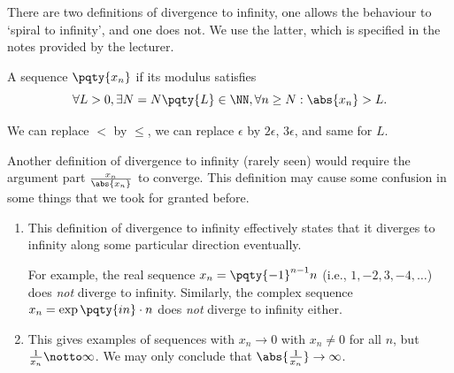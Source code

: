 There are two definitions of divergence to infinity, one allows the behaviour to `spiral to infinity', and one does not. We use the latter, which is specified in the notes provided by the lecturer.

\begin{definition}
    \label{def:seq-divergence-to-infinity}%
    A sequence \(\pqty{x_n}\)  if its modulus satisfies
    \[
        \forall L > 0, \exists N = N \pqty{L} \in \NN, \forall n \geq N: \abs{x_n} > L.
    \]
\end{definition}

\begin{remark}
    We can replace \(<\) by \(\leq\), we can replace \(\epsilon\) by \(2 \epsilon\), \(3 \epsilon\), and same for \(L\).
\end{remark}

\begin{remarks}
    Another definition of divergence to infinity (rarely seen) would require the argument part \(\frac{x_n}{\abs{x_n}}\) to converge. This definition may cause some confusion in some things that we took for granted before.

    \begin{enumerate}
        \item This definition of divergence to infinity effectively states that it diverges to infinity along some particular direction eventually.
        
        For example, the real sequence \(x_n = \pqty{-1}^{n - 1} n\) (i.e., \(1, -2, 3, -4, \ldots\)) does \emph{not} diverge to infinity. Similarly, the complex sequence \(x_n = \exp\pqty{in} \cdot n\) does \emph{not} diverge to infinity either.
        
        \item This gives examples of sequences with \(x_n \to 0\) with \(x_n \neq 0\) for all \(n\), but \(\frac{1}{x_n} \notto \infty\). We may only conclude that \(\abs{\frac{1}{x_n}} \to \infty\).
    \end{enumerate}
\end{remarks}


